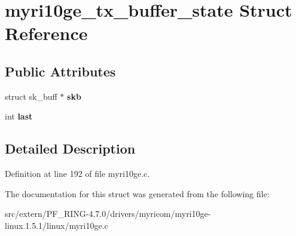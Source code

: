 \hypertarget{structmyri10ge__tx__buffer__state}{
\section{myri10ge\_\-tx\_\-buffer\_\-state Struct Reference}
\label{structmyri10ge__tx__buffer__state}
}
\subsection*{Public Attributes}
\begin{DoxyCompactItemize}
\item 
\hypertarget{structmyri10ge__tx__buffer__state_ae1cf564e3f15aea99754be3ce882ad18}{
struct sk\_\-buff $\ast$ {\bfseries skb}}
\label{structmyri10ge__tx__buffer__state_ae1cf564e3f15aea99754be3ce882ad18}

\item 
\hypertarget{structmyri10ge__tx__buffer__state_a85b7c1be27597c5824ab68404614ee64}{
int {\bfseries last}}
\label{structmyri10ge__tx__buffer__state_a85b7c1be27597c5824ab68404614ee64}

\end{DoxyCompactItemize}


\subsection{Detailed Description}


Definition at line 192 of file myri10ge.c.



The documentation for this struct was generated from the following file:\begin{DoxyCompactItemize}
\item 
src/extern/PF\_\-RING-\/4.7.0/drivers/myricom/myri10ge-\/linux.1.5.1/linux/myri10ge.c\end{DoxyCompactItemize}
